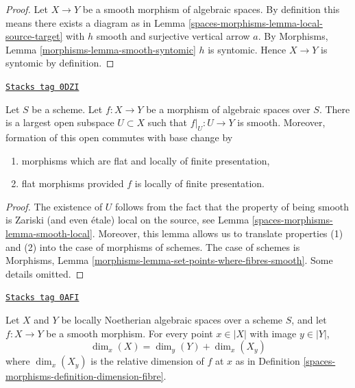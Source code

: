 \begin{proof}
Let $X \to Y$ be a smooth morphism of algebraic spaces. By
definition this means there exists a diagram as in
Lemma \ref{spaces-morphisms-lemma-local-source-target}
with $h$ smooth and surjective vertical arrow $a$. By
Morphisms, Lemma \ref{morphisms-lemma-smooth-syntomic}
$h$ is syntomic. Hence $X \to Y$ is syntomic by definition.
\end{proof}

\begin{lemma}
\label{spaces-morphisms-lemma-where-smooth}
\href{https://stacks.math.columbia.edu/tag/0DZI}{\texttt{Stacks tag 0DZI}}

Let $S$ be a scheme. Let $f : X \to Y$ be a morphism of algebraic
spaces over $S$. There is a largest open subspace $U \subset X$
such that $f|_U : U \to Y$ is smooth. Moreover, formation of
this open commutes with base change by
\begin{enumerate}
\item morphisms which are flat and
locally of finite presentation,
\item flat morphisms provided $f$ is locally of finite presentation.
\end{enumerate}
\end{lemma}

\begin{proof}
The existence of $U$ follows from the fact that the property
of being smooth is Zariski (and even \'etale) local on the source, see
Lemma \ref{spaces-morphisms-lemma-smooth-local}. Moreover, this lemma allows
us to translate properties (1) and (2) into the case
of morphisms of schemes. The case of schemes is
Morphisms, Lemma \ref{morphisms-lemma-set-points-where-fibres-smooth}.
Some details omitted.
\end{proof}

\begin{lemma}
\label{spaces-morphisms-lemma-smoothness-dimension-spaces}
\href{https://stacks.math.columbia.edu/tag/0AFI}{\texttt{Stacks tag 0AFI}}

Let $X$ and $Y$ be locally Noetherian algebraic spaces over a scheme
$S$, and let $f : X \to Y$ be a smooth morphism.
For every point $x \in |X|$ with image $y \in |Y|$,
$$
\dim_x(X) = \dim_y(Y) + \dim_x(X_y)
$$
where $\dim_x(X_y)$ is the relative dimension of $f$ at $x$ as
in Definition \ref{spaces-morphisms-definition-dimension-fibre}.
\end{lemma}

